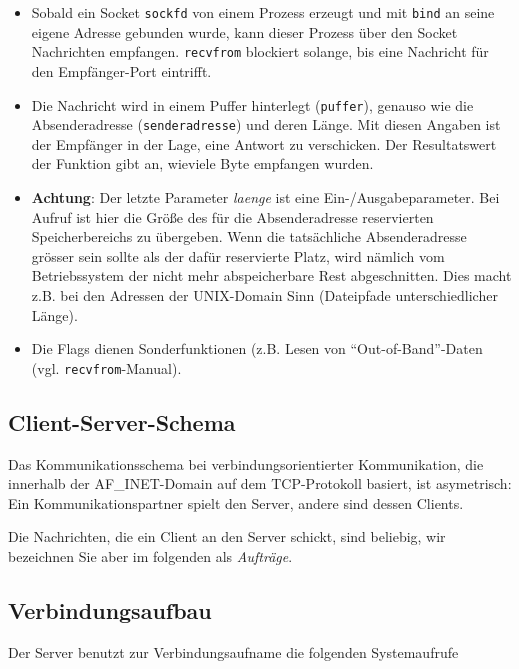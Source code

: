 \documentclass[12pt,utf8]{article}
\begin{document}
\begin{itemize}
\item 
Sobald ein Socket {\tt sockfd} von einem Prozess erzeugt und mit {\tt bind}
an seine eigene Adresse gebunden wurde, kann dieser Prozess über den Socket
Nachrichten empfangen. {\tt recvfrom} blockiert solange, bis eine Nachricht
für den Empfänger-Port eintrifft.

\item 
Die Nachricht wird in einem Puffer hinterlegt ({\tt puffer}), genauso wie
die Absenderadresse ({\tt senderadresse}) und deren Länge. Mit diesen Angaben
ist der Empfänger in der Lage, eine Antwort zu verschicken.
Der Resultatswert der Funktion gibt an, wieviele Byte empfangen wurden.

\item 
{\bf Achtung}: Der letzte Parameter {\em laenge\/} ist eine Ein-/Ausgabeparameter.
Bei Aufruf ist hier die Größe des für die Absenderadresse reservierten
Speicherbereichs zu übergeben. Wenn die tatsächliche Absenderadresse grösser
sein sollte als der dafür reservierte Platz, wird nämlich vom Betriebssystem
der nicht mehr abspeicherbare Rest abgeschnitten. Dies macht z.B.
bei den Adressen der UNIX-Domain Sinn (Dateipfade unterschiedlicher Länge).

\item 
Die Flags dienen Sonderfunktionen (z.B. Lesen von
"`Out-of-Band"'-Daten (vgl. {\tt recvfrom}-Manual).
\end{itemize}




\subsection*{Client-Server-Schema}

Das Kommunikationsschema bei verbindungsorientierter Kommunikation, die
innerhalb der AF\_INET-Domain auf dem TCP-Protokoll basiert, ist asymetrisch:
Ein Kommunikationspartner spielt den Server, andere sind dessen Clients.

Die Nachrichten, die ein Client an den Server schickt, sind beliebig, wir
bezeichnen Sie aber im folgenden als {\em Aufträge}.


\subsection*{Verbindungsaufbau}

Der Server benutzt zur Verbindungsaufname die folgenden Systemaufrufe
\end{document}
